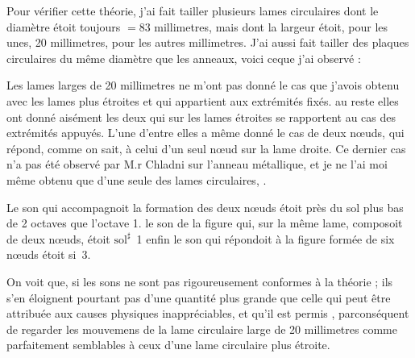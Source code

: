 \documentclass[11pt,a4paper]{article}
\begin{document}
Pour vérifier cette théorie, j'ai fait tailler plusieurs
lames circulaires dont le diamètre étoit toujours $=83$ millimetres,
mais dont la largeur étoit, pour les unes, 20 millimetres,
 pour les autres  millimetres. J'ai aussi fait
tailler des plaques  circulaires du même diamètre
que les anneaux, voici ceque j'ai observé :

Les lames larges de 20 millimetres ne m'ont pas
donné le cas que j'avois obtenu avec les lames plus
étroites et qui appartient aux extrémités fixés.
 au reste elles ont donné aisément les deux
  qui sur les lames étroites se rapportent au cas
des extrémités appuyés. L'une d'entre elles a même
donné le cas de deux nœuds, qui répond, comme
on sait, à celui d'un seul nœud sur la lame
droite.  Ce dernier cas n'a pas été observé
par M.r Chladni sur l'anneau métallique, et
je ne l'ai moi même obtenu que d'une seule
des lames  circulaires, .



Le son qui accompagnoit la formation des deux nœuds étoit
près du sol plus bas de 2 octaves que l'octave 1.
le son de la figure qui, sur la même lame,   composoit
de deux nœuds, étoit $\text{sol}^{\sharp}$~1 enfin le son qui répondoit
à la figure formée de six nœuds étoit si~3.

On voit que, si les sons ne sont pas rigoureusement
conformes à la théorie ; ils  s'en éloignent pourtant
pas d'une quantité  plus grande que celle
qui peut être attribuée aux causes physiques inappréciables,
et qu'il est permis , parconséquent de regarder
les mouvemens de la lame circulaire large de 20 millimetres
comme parfaitement semblables à ceux d'une lame
circulaire  plus étroite.
\end{document}
